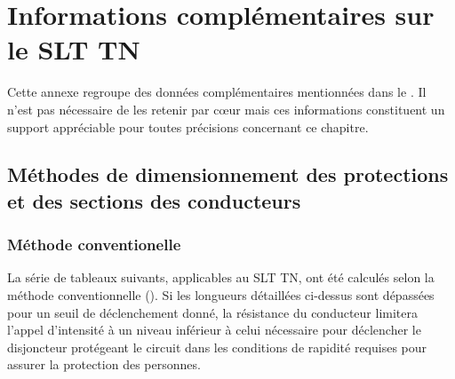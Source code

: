 

\begin{comment}

\documentclass[a4paper, 11pt, twoside, fleqn]{memoir}

\usepackage{AOCDTF}

\marqueurchapitre


	\openleft %

\end{comment}

\chapter{Informations complémentaires sur le SLT TN\label{ann:schema_tn}}

Cette annexe regroupe des données complémentaires mentionnées dans le . Il n'est pas nécessaire de les retenir par c\oe{}ur mais ces informations constituent un support appréciable pour toutes précisions concernant ce chapitre.

\section{Méthodes de dimensionnement des protections et des sections des conducteurs}

\subsection{Méthode conventionelle}

La série de tableaux suivants, applicables au SLT TN, ont été calculés selon la méthode conventionnelle (). Si les longueurs détaillées ci-dessus sont dépassées pour un seuil de déclenchement donné, la résistance du conducteur limitera l'appel d'intensité à un niveau inférieur à celui nécessaire pour déclencher le disjoncteur protégeant le circuit dans les conditions de rapidité requises pour assurer la protection des personnes.\\

